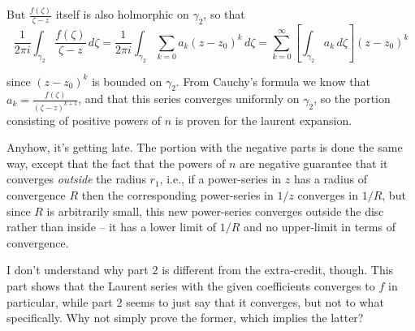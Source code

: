 \documentclass[letterpaper, 11pt]{article}
\begin{document}
\begin{enumerate}
But $\frac{f(\zeta)}{\zeta - z}$ itself is also holmorphic on $\gamma_2$, so that
\[
\frac{1}{2\pi i}  \int_{\gamma_2} \frac{f(\zeta)}{\zeta-z}\,d\zeta = \frac{1}{2\pi i} \int_{\gamma_2} \sum_{k=0} a_k (z-z_0)^k\,d\zeta = \sum_{k=0}^\infty \left[\int_{\gamma_2} a_k \,d\zeta\right] (z-z_0)^k
\]

since $(z-z_0)^k$ is bounded on $\gamma_2$.  From Cauchy's formula we know that $a_k = \frac{f(\zeta)}{(\zeta-z)^{k+1}}$, and that this series converges uniformly on $\gamma_2$, so the portion consisting of positive powers of $n$ is proven for the laurent expansion.

Anyhow, it's getting late.  The portion with the negative parts is done the same way, except that the fact that the powers of $n$ are negative guarantee that it converges \emph{outside} the radius $r_1$, i.e., if a power-series in $z$ has a radius of convergence $R$ then the corresponding power-series in $1/z$ converges in $1/R$, but since $R$ is arbitrarily small, this new power-series converges outside the disc rather than inside -- it has a lower limit of $1/R$ and no upper-limit in terms of convergence.

I don't understand why part 2 is different from the extra-credit, though.  This part shows that the Laurent series with the given coefficients converges to $f$ in particular, while part 2 seems to just say that it converges, but not to what specifically.  Why not simply prove the former, which implies the latter?

\end{enumerate}
\end{document}
